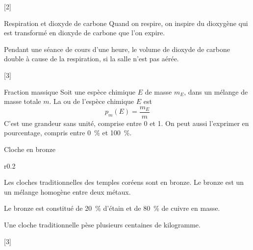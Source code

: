 [2]

\begin{doc}{Respiration et dioxyde de carbone}
  Quand on respire, on inspire du dioxygène \dioxygene qui est transformé en dioxyde de carbone \dioxydeDeCarbone que l'on expire.

  Pendant une séance de cours d'une heure, le volume de dioxyde de carbone \dioxydeDeCarbone double à cause de la respiration, si la salle n'est pas aérée.
\end{doc}

[3]


\begin{doc}{Fraction massique}
  Soit une espèce chimique $E$ de masse $m_E$, dans un mélange de masse totale $m$.
  La  ou  de l'espèce chimique $E$ est
  \begin{equation*}
    p_{m}(E) = \frac{m_E}{m}
  \end{equation*}
  C'est une grandeur sans unité, comprise entre 0 et 1.
  On peut aussi l'exprimer en pourcentage, compris entre \qty{0}{\percent} et \qty{100}{\percent}.
\end{doc}

\begin{doc}{Cloche en bronze}
  \begin{wrapfigure}[5]{r}{0.2\linewidth}
    \vspace*{-31pt}
    \centering
  \end{wrapfigure}
  
  Les cloches traditionnelles des temples coréens sont en bronze.
  Le bronze est un  un mélange homogène entre deux métaux.
  
  Le bronze est constitué de \qty{20}{\percent} d'étain  et de \qty{80}{\percent} de cuivre  en masse.

  Une cloche traditionnelle pèse plusieurs centaines de kilogramme.
\end{doc}


[3]

